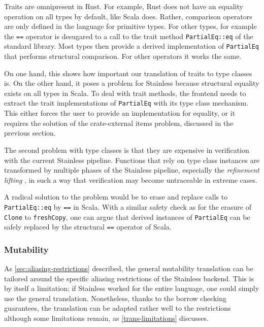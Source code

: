 Traits are omnipresent in Rust. For example, Rust does not have an equality
operation on all types by default, like Scala does. Rather, comparison operators
are only defined in the language for primitive types. For other types, for
example the \lstinline!==! operator is desugared to a call to the trait method
\lstinline!PartialEq::eq! of the standard library. Most types then provide a
derived implementation of \lstinline!PartialEq! that performs structural
comparison. For other operators it works the same.

On one hand, this shows how important our translation of traits to type classes
is. On the other hand, it poses a problem for Stainless because structural
equality exists on all types in Scala. To deal with trait methods, the frontend
needs to extract the trait implementations of \lstinline!PartialEq! with its
type class mechanism. This either forces the user to provide an implementation
for equality, or it requires the solution of the crate-external items problem,
discussed in the previous section.

The second problem with type classes is that they are expensive in verification
with the current Stainless pipeline. Functions that rely on type class instances
are transformed by multiple phases of the Stainless pipeline, especially the
\emph{refinement lifting} \cite{inox}, in such a way that verification may
become untraceable in extreme cases.

A radical solution to the problem would be to erase and replace calls to
\lstinline!PartialEq::eq! by \lstinline!==! in Scala. With a similar safety
check as for the erasure of \lstinline!Clone! to \lstinline!freshCopy!, one can
argue that derived instances of \lstinline!PartialEq! can be safely replaced by
the structural \lstinline!==! operator of Scala.

\subsubsection{Mutability}

As \autoref{sec:aliasing-restrictions} described, the general mutability
translation can be tailored around the specific aliasing restrictions of the
Stainless backend. This is by itself a limitation; if Stainless worked for the
entire language, one could simply use the general translation. Nonetheless,
thanks to the borrow checking guarantees, the translation can be adapted rather
well to the restrictions although some limitations remain, as
\autoref{trans-limitations} discusses.

